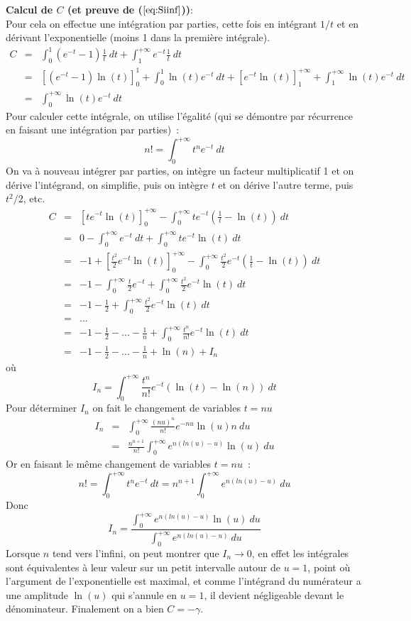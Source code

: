 \documentclass[a4paper,11pt]{article}
\begin{document}
\begin{giacjshere}
{\bf Calcul de $C$ (et preuve de (\(\ref{eq:Siinf}\)))}:\\
Pour cela on effectue une intégration par parties, cette fois en intégrant $1/t$
et en dérivant l'exponentielle (moins 1 dans la première intégrale).
\begin{eqnarray*}
 C&=&\int_0^{1}(e^{-t}-1)\frac{1}{t} \ dt + \int_1^{+\infty} e^{-t} \frac{1}{t} \ dt\\
&=&[(e^{-t}-1)\ln(t)]_0^1 +\int_0^1 \ln(t) e^{-t} \ dt + [e^{-t} \ln(t)]_1^{+\infty}
+\int_1^{+\infty} \ln(t) e^{-t} \ dt \\
&=& \int_0^{+\infty} \ln(t) e^{-t} \ dt
\end{eqnarray*}
Pour calculer cette intégrale, on utilise
l'égalité (qui se démontre par récurrence en faisant une 
intégration par parties)~:
\[ n!= \int_0^{+\infty}t^n e^{-t} \ dt \]
On va à nouveau intégrer par parties,
on intègre un facteur multiplicatif 1 
et on dérive l'intégrand, on simplifie, puis
on intègre $t$ et on dérive l'autre terme, puis $t^2/2$, etc. 
\begin{eqnarray*}
 C&=&[te^{-t} \ln(t)]_0^{+\infty} - \int_0^{+\infty} t e^{-t}(\frac{1}{t}-\ln(t)) \ dt \\
&=& 0 - \int_0^{+\infty} e^{-t} \ dt + \int_0^{+\infty} t e^{-t} \ln(t) \ dt \\
&=& -1 + [\frac{t^2}{2}e^{-t} \ln(t)]_0^{+\infty} 
- \int_0^{+\infty} \frac{t^2}{2} e^{-t}(\frac{1}{t}-\ln(t)) \ dt \\
&=& -1 - \int_0^{+\infty} \frac{t}{2} e^{-t} +  \int_0^{+\infty} \frac{t^2}{2} e^{-t} \ln(t) \ dt \\
&=& -1 - \frac{1}{2} +  \int_0^{+\infty} \frac{t^2}{2} e^{-t} \ln(t) \ dt \\
&=& ...\\
&=& -1 - \frac{1}{2} - ... -  \frac{1}{n} + \int_0^{+\infty} \frac{t^n}{n!} e^{-t} \ln(t) \ dt \\
&=& -1 - \frac{1}{2} - ... -  \frac{1}{n} + \ln(n) + I_n
\end{eqnarray*}
où
\[ I_n=\int_0^{+\infty} \frac{t^n}{n!} e^{-t} (\ln(t)-\ln(n)) \ dt \]
Pour déterminer $I_n$ on fait le changement de variables $t=nu$
\begin{eqnarray*}
 I_n&=&\int_0^{+\infty} \frac{(nu)^n}{n!} e^{-nu} \ln(u) n\ du \\
&=& \frac{n^{n+1}}{n!} \int_0^{+\infty} e^{n(ln(u)-u)} \ln(u) \ du 
\end{eqnarray*}
Or en faisant le même changement de variables $t=nu$~:
\[ n!= \int_0^{+\infty}t^n e^{-t} \ dt = n^{n+1} \int_0^{+\infty} e^{n(ln(u)-u)} \ du
\]
Donc
\[ I_n= \frac{\int_0^{+\infty} e^{n(ln(u)-u)} \ln(u) \ du}
{\int_0^{+\infty} e^{n(ln(u)-u)} \ du}  \]
Lorsque $n$ tend vers l'infini, on peut montrer que $I_n \rightarrow 0$, en effet les intégrales
sont équivalentes à leur valeur sur un petit intervalle autour de $u=1$, point où l'argument
de l'exponentielle est maximal, 
et comme l'intégrand du numérateur a une amplitude $\ln(u)$ qui s'annule en $u=1$, 
il devient négligeable devant le dénominateur. Finalement on a bien $C=-\gamma$.


\end{giacjshere}
\end{document}
